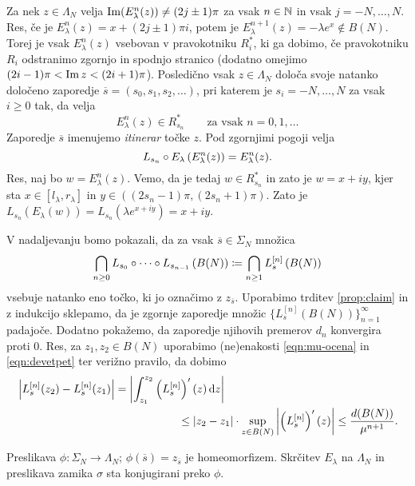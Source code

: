 Za nek \(z \in \Lambda_N\) velja \(\operatorname{Im} (E_\lambda^n (z)) \neq (2j \pm 1) \pi\) za vsak \(n \in \mathbb N\) in vsak \(j = -N, \dots, N\). Res, če je \(E_\lambda^n (z) = x + (2j \pm 1) \pi i\), potem je \(E_\lambda^{n + 1} (z) = - \lambda e^x \notin B (N)\). Torej je vsak \(E_\lambda^n (z)\) vsebovan v pravokotniku \(R_i^*\), ki ga dobimo, če pravokotniku \(R_i\) odstranimo zgornjo in spodnjo stranico (dodatno omejimo \((2i - 1) \pi < \operatorname{Im} z < (2i + 1) \pi\)). Posledično vsak \(z \in \Lambda_N\) določa svoje natanko določeno zaporedje \(\overline{s} = (s_0, s_1, s_2, \dots)\), pri katerem je \(s_i = -N, \dots, N\) za vsak \(i \geq 0\) tak, da velja
\begin{equation} \label{eqn:itinerar}
    E_\lambda^n (z) \in R_{s_n}^* \qquad \text{za vsak } n = 0, 1, \dots
\end{equation}
Zaporedje \(\overline{s}\) imenujemo \emph{itinerar} točke \(z\). Pod zgornjimi pogoji velja
\begin{equation} \label{eqn:devetpet}
    L_{s_n} \circ E_\lambda \left( E_\lambda^n (z) \right) = E_\lambda^n (z).
\end{equation}
Res, naj bo \(w = E_\lambda^n (z)\). Vemo, da je tedaj \(w \in R_{s_n}^*\) in zato je \(w = x + i y\), kjer sta \(x \in [l_\lambda, r_\lambda]\) in \(y \in ((2 s_n - 1) \pi, (2 s_n + 1) \pi)\). Zato je \(L_{s_n} (E_\lambda (w)) = L_{s_n} (\lambda e^{x + i y}) = x + i y\).

V nadaljevanju bomo pokazali, da za vsak \(\overline{s} \in \Sigma_N\) množica
\[\bigcap_{n \geq 0} L_{s_0} \circ \dots \circ L_{s_{n - 1}} \left( B (N) \right) \coloneq \bigcap_{n \geq 1} L_s^{[n]} \left( B (N) \right)\]
vsebuje natanko eno točko, ki jo označimo z \(z_{\overline{s}}\). Uporabimo trditev \ref{prop:claim} in z indukcijo sklepamo, da je zgornje zaporedje množic \(\{L_s^{[n]} (B (N))\}_{n = 1}^{\infty}\) padajoče. Dodatno pokažemo, da zaporedje njihovih premerov \(d_n\) konvergira proti \num{0}. Res, za \(z_1, z_2 \in B(N)\) uporabimo (ne)enakosti \eqref{eqn:mu-ocena} in \eqref{eqn:devetpet} ter verižno pravilo, da dobimo
\[ \begin{multlined}[12cm]
    \left| L_s^{[n]}(z_2) - L_s^{[n]}(z_1) \right| = \left| \int_{z_1}^{z_2} \prt{L_s^{[n]}}' (z) \, \dd z \right|\\
    \leq |z_2 - z_1| \cdot \sup_{z \in B(N)}\left| \left( L_s^{[n]} \right)'(z) \right| \leq \frac{d(B(N))}{\mu^{n+1}}.
\end{multlined} \]

\begin{izrek}
    Preslikava \(\phi \colon \Sigma_N \to \Lambda_N\); \(\phi (\overline{s}) = z_{\overline{s}}\) je homeomorfizem. Skrčitev \(E_\lambda\) na \(\Lambda_N\) in preslikava zamika \(\sigma\) sta konjugirani preko \(\phi\). 
\end{izrek}

